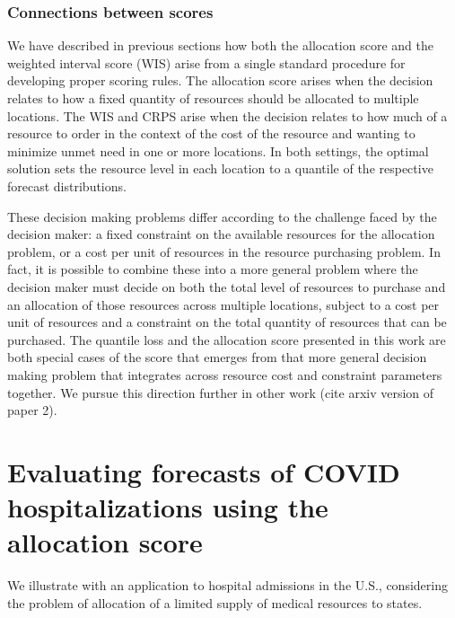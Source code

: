 \documentclass{article}\usepackage[]{graphicx}\usepackage[]{xcolor}
\begin{document}
\subsubsection{Connections between scores}
\label{sec:methods.generalization}

We have described in previous sections how both the allocation score and the weighted interval score (WIS) arise from a single standard procedure for developing proper scoring rules.
The allocation score arises when the decision relates to how a fixed quantity of resources should be allocated to multiple locations.
The WIS and CRPS arise when the decision relates to how much of a resource to order in the context of the cost of the resource and wanting to minimize unmet need in one or more locations.
In both settings, the optimal solution sets the resource level in each location to a quantile of the respective forecast distributions.

These decision making problems differ according to the challenge faced by the decision maker: a fixed constraint on the available resources for the allocation problem, or a cost per unit of resources in the resource purchasing problem. In fact, it is possible to combine these into a more general problem where the decision maker must decide on both the total level of resources to purchase and an allocation of those resources across multiple locations, subject to a cost per unit of resources and a constraint on the total quantity of resources that can be purchased. The quantile loss and the allocation score presented in this work are both special cases of the score that emerges from that more general decision making problem that integrates across resource cost and constraint parameters together. We pursue this direction further in other work (cite arxiv version of paper 2).

\section{Evaluating forecasts of COVID hospitalizations using the allocation score}
\label{sec:application}

We illustrate with an application to hospital admissions in the U.S., considering the problem of allocation of a limited supply of medical resources to states.
\end{document}
